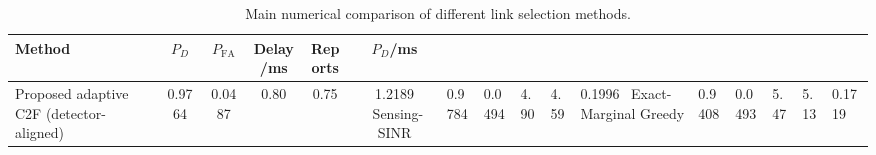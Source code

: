 \begin{table}[t]
    \centering
    \caption{Main numerical comparison of different link selection methods.}
    \label{tab:main_summary}
    \begin{tabular}{l c c c c c}
        \hline
        Method & $P_D$ & $P_{\mathrm{FA}}$ & Delay/ms & Reports & $P_D$/ms \\
        \hline
        Proposed adaptive C2F (detector-aligned) & 0.9764 & 0.0487 & 0.80 & 0.75 & 1.2189 \
        Sensing-SINR & 0.9784 & 0.0494 & 4.90 & 4.59 & 0.1996 \
        Exact-Marginal Greedy & 0.9408 & 0.0493 & 5.47 & 5.13 & 0.1719 \
        \hline
    \end{tabular}
\end{table}
